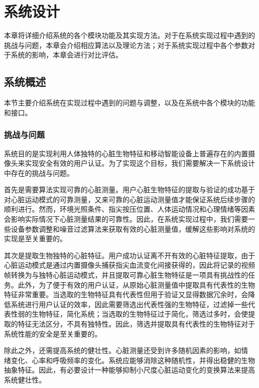 %
%
%
%
%
%
\chapter{系统设计}
{本章将详细介绍系统的各个模块功能及其实现方法。对于在系统实现过程中遇到的挑战与问题，本章会介绍相应算法以及理论方法；对于系统实现过程中各个参数对于系统的影响，本章会进行对比评估。}
\section{系统概述}
{本节主要介绍系统在实现过程中遇到的问题与调整，以及在系统中各个模块的功能和接口。}
\subsection{挑战与问题}
{系统目的是实现利用人体独特的心脏生物特征和移动智能设备上普遍存在的内置摄像头来实现安全有效的用户认证。为了实现这个目标，我们需要解决一下系统设计中存在的挑战与问题。}
\par{首先是需要算法实现可靠的心脏测量。用户心脏生物特征的提取与验证的成功基于对心脏运动模式的可靠测量，又来可靠的心脏运动测量值才能保证系统后续步骤的顺利进行。然而，环境光照条件、指尖按压位置、人体运动情况和心理情绪等因素会影响实际情况下心脏测量结果的可靠性。因此，在系统实现过程中，我们需要一些设备参数调整和噪音过滤算法来获取有效的心脏测量值，缓解这些影响对系统的实现是至关重要的。}
\par
{其次是提取生物独特的心脏特征。用户成功认证离不开有效的心脏特征提取，由于心脏运动模式是通过内置摄像头捕获指尖血流变化间接获得的，因此将记录的视频帧转换为与独特心脏运动模式，并且提取可靠心脏生物特征是一项具有挑战性的任务。此外，为了便于有效的用户认证，从原始心脏测量值中提取具有代表性的生物特征非常重要。当选取的生物特征具有代表性但用于验证又显得数据冗余时，会降低系统进行用户认证的效率，因此需要筛选出代表性强的生物特征，过滤掉一些代表性弱的生物特征，简化系统；当选取的生物特征过于简化，筛选过多时，会使提取的特征无法区分，不具有独特性。因此，筛选并提取具有代表性的生物特征对于系统性能的安全是至关重要的。}
\par
{除此之外，还需提高系统的健壮性。心脏测量还受到许多随机因素的影响，如情 绪变化、心率和呼吸频率的变化。系统应能够消除这种随机性，并得出稳健的生物抽象特征。因此，有必要设计一种能够抑制小尺度心脏运动变化的变换算法来提高系统健壮性。}
